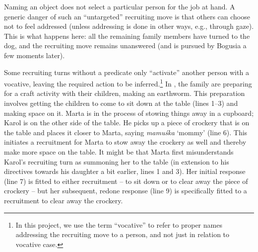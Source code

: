 \documentclass[output=paper]{langsci/langscibook}
\begin{document}
Naming an object does not select a particular person for the job at hand.  A generic danger of such an “untargeted” recruiting move is that others can choose not to feel addressed (unless addressing is done in other ways, e.g., through gaze).  This is what happens here: all the remaining family members have turned to the dog, and the recruiting move remains unanswered (and is pursued by Bogusia a few moments later).

Some recruiting turns without a predicate only ``activate'' another person with a vocative, leaving the required action to be inferred.\footnote{In this project, we use the term “vocative” to refer to proper names addressing the recruiting move to a person, and not just in relation to vocative case.}  In , the family are preparing for a craft activity with their children, making an earthworm.  This preparation involves getting the children to come to sit down at the table (lines 1--3) and making space on it.  Marta is in the process of stowing things away in a cupboard; Karol is on the other side of the table.  He picks up a piece of crockery that is on the table and places it closer to Marta, saying \textit{mamuś}\textit{ka} ‘mommy’ (line 6).  This initiates a recruitment for Marta to stow away the crockery as well and thereby make more space on the table.  It might be that Marta first misunderstands Karol’s recruiting turn as summoning her to the table (in extension to his directives towards his daughter a bit earlier, lines 1 and 3).  Her initial response (line 7) is fitted to either recruitment -- to sit down or to clear away the piece of crockery -- but her subsequent, redone response (line 9) is specifically fitted to a recruitment to clear away the crockery.
\end{document}
